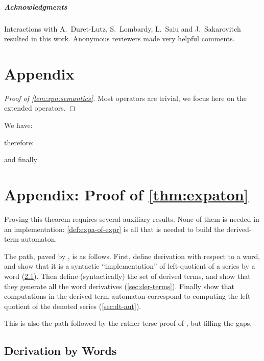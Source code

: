\documentclass[a4paper,USenglish]{lipics}
\begin{document}
\subparagraph*{Acknowledgments} Interactions with A.~Duret-Lutz,
S.~Lombardy, L.~Saiu and J.~Sakarovitch resulted in this work.  Anonymous
reviewers made very helpful comments.




\appendix
\section{Appendix}
\label{sec:appendix}

\begin{proof}[Proof of \cref{lem:xpn:semantics}]
  Most operators are trivial, we focus here on the extended operators.
  

  
\end{proof}

\begin{Example}
  \label{ex:ab:xpn:detailed}
  We have:
  
  
  therefore:
  
  and finally
  
\end{Example}

\section{Appendix: Proof of \cref{thm:expaton}}
\label{app:proof:expaton}

Proving this theorem requires several auxiliary results.  None of them is
needed in an implementation: \cref{def:expa-of-expr} is all that is needed
to build the derived-term automaton.

The path, paved by \citet{lombardy.2005.tcs}, is as follows.  First, define
derivation with respect to a word, and show that it is a syntactic
``implementation'' of left-quotient of a series by a word
(\cref{sec:der:word}).  Then define (syntactically) the set of derived
terms, and show that they generate all the word derivatives
(\cref{sec:der-terms}).  Finally show that computations in the derived-term
automaton correspond to computing the left-quotient of the denoted series
(\cref{sec:dt-aut}).

This is also the path followed by the rather terse proof of
\citet[Proposition~4]{caron.2011.lata.2}, but filling the gaps.

\subsection{Derivation by Words}
\label{sec:der:word}
\begin{Definition}
  
\end{Definition}
\end{document}
